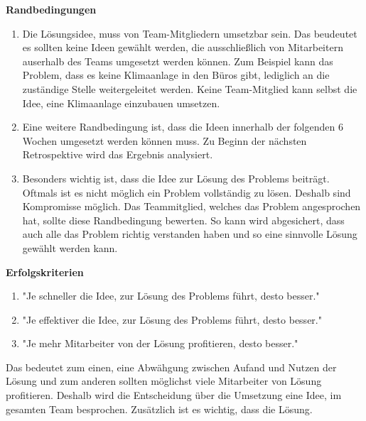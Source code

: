 \textbf{Randbedingungen}
\begin{enumerate}
    \item Die Lösungsidee, muss von Team-Mitgliedern umsetzbar sein. Das beudeutet es sollten keine Ideen gewählt werden, die ausschließlich von Mitarbeitern auserhalb des Teams
    umgesetzt werden können. Zum Beispiel kann das Problem, dass es keine Klimaanlage in den Büros gibt, lediglich an die zuständige Stelle weitergeleitet werden.
    Keine Team-Mitglied kann selbst die Idee, eine Klimaanlage einzubauen umsetzen. 
    \item Eine weitere Randbedingung ist, dass die Ideen innerhalb der folgenden 6 Wochen umgesetzt werden können muss. Zu Beginn der 
    nächsten Retrospektive wird das Ergebnis analysiert.
    \item Besonders wichtig ist, dass die Idee zur Lösung des Problems beiträgt. Oftmals ist es nicht möglich ein Problem vollständig zu lösen. 
    Deshalb sind Kompromisse möglich. Das Teammitglied, welches das Problem angesprochen hat, sollte diese Randbedingung bewerten. So kann 
    wird abgesichert, dass auch alle das Problem richtig verstanden haben und so eine sinnvolle Lösung gewählt werden kann. 
\end{enumerate}

\textbf{Erfolgskriterien}
\begin{enumerate}
    \item "Je schneller die Idee, zur Lösung des Problems führt, desto besser." 
    \item "Je effektiver die Idee, zur Lösung des Problems führt, desto besser."
    \item "Je mehr Mitarbeiter von der Lösung profitieren, desto besser."
\end{enumerate}

Das bedeutet zum einen, eine Abwähgung zwischen Aufand und Nutzen der Lösung und zum anderen sollten möglichst viele Mitarbeiter 
von Lösung profitieren. Deshalb wird die Entscheidung über die Umsetzung eine Idee, im gesamten Team besprochen. Zusätzlich ist es wichtig,
dass die Lösung. 